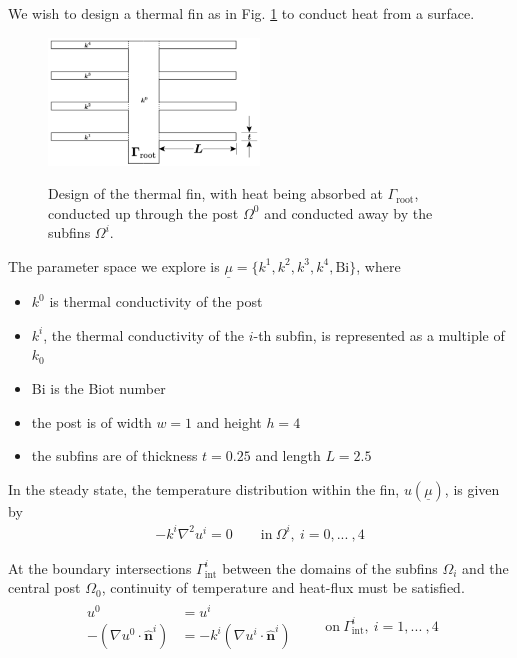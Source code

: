 We wish to design a thermal fin as in Fig. \ref{prj2_thermalfin} to conduct heat from a surface.

\begin{figure}[h!]
\centering
\includegraphics[width=0.5\textwidth]{figures/prj2_thermalfin.png}\\
\caption{Design of the thermal fin, with heat being absorbed at $\Gamma_\text{root}$, conducted up through the post $\Omega^0$ and conducted away by the subfins $\Omega^i$.}
\label{prj2_thermalfin}
\end{figure}

The parameter space we explore is $\underline{\mu}=\{ k^1,k^2,k^3,k^4,\text{Bi} \}$, where
\begin{itemize}[noitemsep,nolistsep]
    \item $k^0$ is thermal conductivity of the post
    \item $k^i$, the thermal conductivity of the $i$-th subfin, is represented as a multiple of $k_0$
    \item Bi is the Biot number
    \item the post is of width $w=1$ and height $h=4$
    \item the subfins are of thickness $t=0.25$ and length $L=2.5$
\end{itemize}

In the steady state, the temperature distribution within the fin, $u(\underline{\mu})$, is given by
\begin{align}
    -k^i\nabla^2u^i = 0\qquad\text{in}\>\Omega^i,\>i=0,...\>,4
\end{align}

At the boundary intersections $\Gamma_\text{int}^i$ between the domains of the subfins $\Omega_i$ and the central post $\Omega_0$, continuity of temperature and heat-flux must be satisfied.
\begin{align}
    \begin{split}
        u^0 &= u^i \\
        -(\nabla u^0\cdot \hat{\mathbf{n}}^i) &= -k^i(\nabla u^i\cdot \hat{\mathbf{n}}^i)
    \end{split}
    \qquad \text{on}\>\Gamma^i_\text{int},\>i=1,...\>,4
\end{align}

